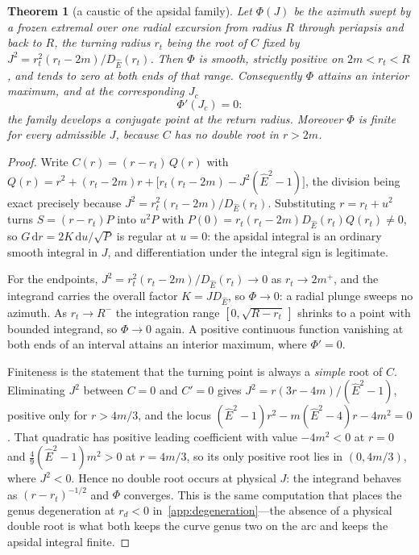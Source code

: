 \documentclass[12pt]{iopart}
\newcommand{\Ehat}{\hat E}
\newcommand{\dd}{\mathrm{d}}
\theoremstyle{plain}
\theoremstyle{definition}
\theoremstyle{plain}
\newtheorem{auxtheorem}[auxlemma]{Theorem}
\theoremstyle{remark}
\begin{document}
\begin{auxtheorem}[a caustic of the apsidal family]\label{thm:caustic}
Let $\Phi(J)$ be the azimuth swept by a frozen extremal over one radial excursion from
radius $R$ through periapsis and back to $R$, the turning radius $r_t$ being the root of
$C$ fixed by $J^2=r_t^2(r_t-2m)/D_{\Ehat}(r_t)$. Then $\Phi$ is smooth, strictly positive
on $2m<r_t<R$, and tends to zero at both ends of that range. Consequently $\Phi$ attains an
interior maximum, and at the corresponding $J_c$
\begin{equation}
   \Phi'(J_c)=0 :
   \label{eq:caustic}
\end{equation}
the family develops a \emph{conjugate point} at the return radius. Moreover $\Phi$ is
finite for every admissible $J$, because $C$ has no double root in $r>2m$.
\end{auxtheorem}

\begin{proof}
Write $C(r)=(r-r_t)\,Q(r)$ with
$Q(r)=r^2+(r_t-2m)r+\big[r_t(r_t-2m)-J^2(\Ehat^2-1)\big]$, the division being exact
precisely because $J^2=r_t^2(r_t-2m)/D_{\Ehat}(r_t)$. Substituting $r=r_t+u^2$ turns
$S=(r-r_t)P$ into $u^2P$ with $P(0)=r_t(r_t-2m)D_{\Ehat}(r_t)Q(r_t)\neq0$, so
$G\,\dd r=2K\,\dd u/\sqrt P$ is regular at $u=0$: the apsidal integral is an ordinary
smooth integral in $J$, and differentiation under the integral sign is legitimate.

For the endpoints, $J^2=r_t^2(r_t-2m)/D_{\Ehat}(r_t)\to0$ as $r_t\to2m^+$, and the
integrand carries the overall factor $K=JD_{\Ehat}$, so $\Phi\to0$: a radial plunge sweeps
no azimuth. As $r_t\to R^-$ the integration range $[0,\sqrt{R-r_t}\,]$ shrinks to a point
with bounded integrand, so $\Phi\to0$ again. A positive continuous function vanishing at
both ends of an interval attains an interior maximum, where $\Phi'=0$.

Finiteness is the statement that the turning point is always a \emph{simple} root of $C$.
Eliminating $J^2$ between $C=0$ and $C'=0$ gives $J^2=r(3r-4m)/(\Ehat^2-1)$, positive only
for $r>4m/3$, and the locus $(\Ehat^2-1)r^2-m(\Ehat^2-4)r-4m^2=0$. That quadratic has
positive leading coefficient with value $-4m^2<0$ at $r=0$ and
$\tfrac49(\Ehat^2-1)m^2>0$ at $r=4m/3$, so its only positive root lies in $(0,4m/3)$,
where $J^2<0$. Hence no double root occurs at physical $J$: the integrand behaves as
$(r-r_t)^{-1/2}$ and $\Phi$ converges. This is the same computation that places the
genus degeneration at $r_d<0$ in~\ref{app:degeneration}---the absence of a physical
double root is what both keeps the curve genus two on the arc and keeps the apsidal
integral finite.
\end{proof}
\end{document}
